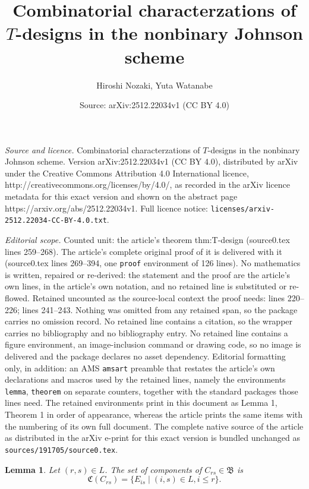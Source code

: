 \documentclass[10pt,a4paper]{amsart}
\title{Combinatorial characterzations of $T$-designs in the nonbinary Johnson scheme}
\author{Hiroshi Nozaki, Yuta Watanabe}
\date{Source: arXiv:2512.22034v1 (CC BY 4.0)}
\newtheorem{lemma}{Lemma}
\begin{document}
\maketitle

\noindent\emph{Source and licence.} Combinatorial characterzations of $T$-designs in the nonbinary Johnson scheme. Version arXiv:2512.22034v1 (CC BY 4.0), distributed by arXiv under the Creative Commons Attribution 4.0 International licence, http://creativecommons.org/licenses/by/4.0/, as recorded in the arXiv licence metadata for this exact version and shown on the abstract page https://arxiv.org/abs/2512.22034v1. Full licence notice: \texttt{licenses/arxiv-2512.22034-CC-BY-4.0.txt}.\par\smallskip

\noindent\textit{Editorial scope.} Counted unit: the article's theorem thm:T-design (source0.tex lines 259--268). The article's complete original proof of it is delivered with it (source0.tex lines 269--394, one \texttt{proof} environment of 126 lines). No mathematics is written, repaired or re-derived: the statement and the proof are the article's own lines, in the article's own notation, and no retained line is substituted or re-flowed.  Retained uncounted as the source-local context the proof needs: lines 220--226; lines 241--243.  Nothing was omitted from any retained span, so the package carries no omission record.  No retained line contains a citation, so the wrapper carries no bibliography and no bibliography entry.  No retained line contains a figure environment, an image-inclusion command or drawing code, so no image is delivered and the package declares no asset dependency.  Editorial formatting only, in addition: an AMS \texttt{amsart} preamble that restates the article's own declarations and macros used by the retained lines, namely the environments \texttt{lemma}, \texttt{theorem} on separate counters, together with the standard packages those lines need.  The retained environments print in this document as Lemma 1, Theorem 1 in order of appearance, whereas the article prints the same items with the numbering of its own full document.  The complete native source of the article as distributed in the arXiv e-print for this exact version is bundled unchanged as \texttt{sources/191705/source0.tex}.
\begin{lemma} \label{lem:component}
Let $(r,s) \in L$. 
The set of components of $C_{rs} \in \mathfrak{B}$ is 
\[
\mathfrak{C}(C_{rs})=\{E_{is}  \mid (i,s) \in L, i\leq r  \}.
\]
\end{lemma}
\end{document}
